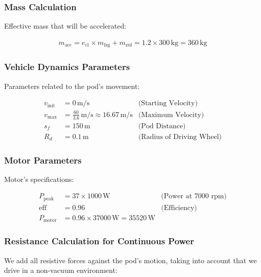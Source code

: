 \subsubsection*{Mass Calculation}

Effective mass that will be accelerated:

\begin{align*}
m_{\text{acc}} =  e_{i1} \times m_{\text{fzg}} + m_{\text{zul}} = 1.2 \times 300 \, \text{kg} = 360 \, \text{kg}
\end{align*}

\subsubsection*{Vehicle Dynamics Parameters}

Parameters related to the pod's movement:

\begin{align*}
v_{\text{init}} &= 0 \, \text{m/s} & \text{(Starting Velocity)} \\
v_{\text{max}} &= \frac{60}{3.6} \, \text{m/s} \approx 16.67 \, \text{m/s} & \text{(Maximum Velocity)} \\
s_f &= 150 \, \text{m} & \text{(Pod Distance)} \\
R_d &= 0.1 \, \text{m} & \text{(Radius of Driving Wheel)} %
\end{align*}

\subsubsection*{Motor Parameters}

Motor's specifications:

\begin{align*}
P_{\text{peak}} &= 37 \times 1000 \, \text{W} & \text{(Power at 7000 rpm)} \\
\text{eff} &= 0.96 & \text{(Efficiency)} \\
P_{\text{motor}} &= 0.96 \times 37000 \, \text{W} = 35520 \, \text{W}
\end{align*}

\subsubsection*{Resistance Calculation for Continuous Power}

We add all resistive forces against the pod's motion, taking into account that we drive in a non-vacuum environment:


